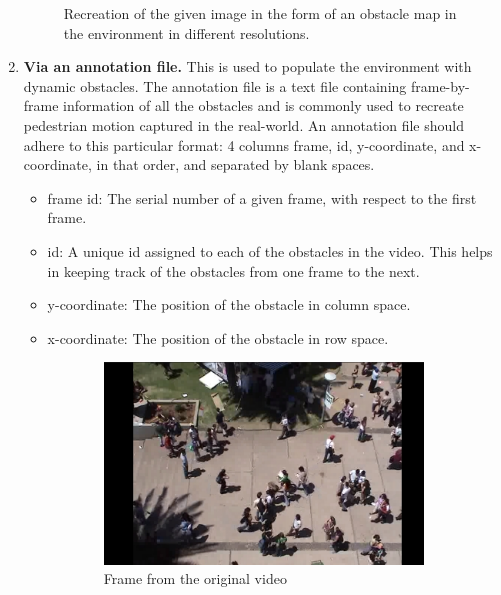 \begin{enumerate}
\begin{figure}[!h]
	\caption{Recreation of the given image in the form of an obstacle map in the environment in different resolutions.}
	\label{fig:fig}
\end{figure}
\item \textbf{Via an annotation file.}
This is used to populate the environment with dynamic obstacles. The annotation file is a text file containing frame-by-frame information of all the obstacles and is commonly used to recreate pedestrian motion captured in the real-world. An annotation file should adhere to this particular format: 4 columns frame, id, y-coordinate, and x-coordinate, in that order, and separated by blank spaces.
\begin{itemize}
    \item frame id: The serial number of a given frame, with respect to the first frame.
    \item id: A unique id assigned to each of the obstacles in the video. This helps in keeping track of the obstacles from one frame to the next.
    \item y-coordinate: The position of the obstacle in column space.
    \item x-coordinate: The position of the obstacle in row space.
\end{itemize}
\begin{figure}[htbp]
	\begin{subfigure}{0.5\textwidth}
		\centering
		\includegraphics[width=.95\linewidth]{figures/video_frame_students.jpg}
		\caption{Frame from the original video}
		\label{fig:anno_sfig1}
	\end{subfigure}
	\begin{subfigure}{0.5\textwidth}
		\centering

\end{subfigure}
\end{figure}
\end{enumerate}
